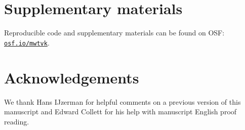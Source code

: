 \documentclass[a4paper,man,natbib,floatsintext,donotrepeattitle]{apa6}
\begin{document}
\section{Supplementary materials}\label{sec:supp}

Reproducible code and supplementary materials can be found on OSF: \href{https://osf.io/mwtvk}{\nolinkurl{osf.io/mwtvk}}.

\section{Acknowledgements}

We thank Hans IJzerman for helpful comments on a previous version of this manuscript and Edward Collett for his help with manuscript English proof reading.


\end{document}
